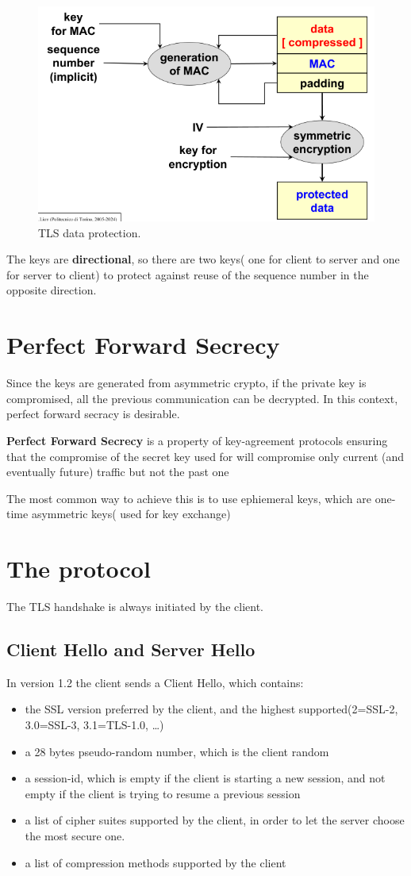 \begin{figure}[H]
  \centering
  \includegraphics[width=.5\textwidth]{img/TLS data protection.png}
  \caption{TLS data protection.}
  \label{fig:tls-data-protection}
\end{figure}

The keys are \textbf{directional}, so there are two keys( one for
client to server and one for server to client) to protect against
reuse of the sequence number in the opposite direction.

\section{Perfect Forward Secrecy}
Since the keys are generated from asymmetric crypto, if the private
key is compromised, all the previous communication can be decrypted.
In this context, perfect forward secracy is desirable.
\begin{boxH}
  \textbf{Perfect Forward Secrecy} is a property of key-agreement
  protocols ensuring that the compromise of the secret key used for 
  will compromise only current (and eventually future) traffic but not
  the past one
\end{boxH}
The most common way to achieve this is to use ephiemeral keys, which
are one-time asymmetric keys( used for key exchange) 

\section{The protocol}
The TLS handshake is always initiated by the client. 

\subsection{Client Hello and Server Hello}
In version 1.2 the client sends a Client Hello, which contains:
\begin{itemize}
  \item the SSL version preferred by the client, and the highest
    supported(2=SSL-2, 3.0=SSL-3, 3.1=TLS-1.0, \dots)
  \item a 28 bytes pseudo-random number, which is the client random
  \item a session-id, which is empty if the client is starting a new
    session, and not empty if the client is trying to resume a 
    previous session
  \item a list of cipher suites supported by the client, in order to 
    let the server choose the most secure one.
  \item a list of compression methods supported by the client
\end{itemize}

